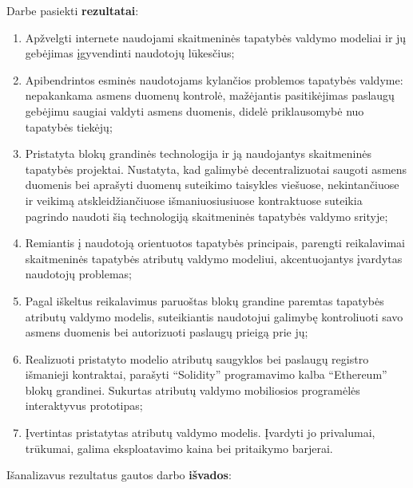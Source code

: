 
Darbe pasiekti \textbf{rezultatai}:

\begin{enumerate}
    \item Apžvelgti internete
    naudojami skaitmeninės tapatybės valdymo modeliai ir jų gebėjimas įgyvendinti naudotojų lūkesčius;
    \item Apibendrintos esminės naudotojams kylančios problemos tapatybės valdyme: nepakankama asmens duomenų
    kontrolė, mažėjantis pasitikėjimas paslaugų gebėjimu saugiai valdyti asmens duomenis, didelė priklausomybė nuo tapatybės tiekėjų;
    \item Pristatyta blokų grandinės technologija ir ją naudojantys skaitmeninės tapatybės projektai.
    Nustatyta, kad galimybė
    decentralizuotai saugoti asmens duomenis bei aprašyti duomenų suteikimo taisykles viešuose, nekintančiuose
    ir veikimą atskleidžiančiuose išmaniuosiusiuose
    kontraktuose suteikia pagrindo
    naudoti šią technologiją skaitmeninės tapatybės valdymo srityje;
    \item Remiantis į naudotoją orientuotos tapatybės principais,
    parengti reikalavimai skaitmeninės tapatybės atributų valdymo modeliui, akcentuojantys įvardytas naudotojų problemas;
    \item Pagal iškeltus reikalavimus paruoštas blokų grandine paremtas tapatybės atributų valdymo modelis, suteikiantis naudotojui galimybę kontroliuoti savo asmens duomenis
    bei autorizuoti paslaugų prieigą prie jų;
    \item Realizuoti pristatyto modelio atributų saugyklos bei paslaugų registro išmanieji kontraktai, parašyti \enquote{Solidity} programavimo kalba \enquote{Ethereum} blokų grandinei.
    Sukurtas atributų valdymo mobiliosios programėlės interaktyvus prototipas;
    \item Įvertintas pristatytas atributų valdymo modelis. Įvardyti jo privalumai, trūkumai,
    galima eksploatavimo kaina bei pritaikymo barjerai.
\end{enumerate}

\hfill \break
Išanalizavus rezultatus gautos darbo \textbf{išvados}:

